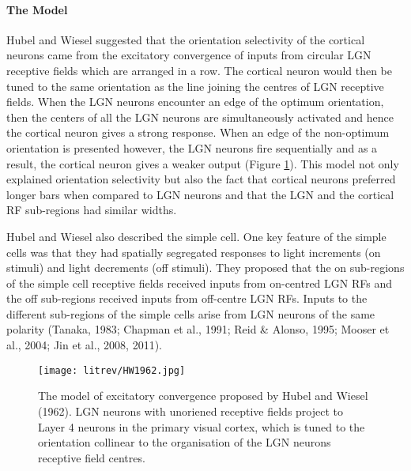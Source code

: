 \paragraph{The Model}Hubel and Wiesel suggested that the orientation selectivity of the cortical neurons came from the excitatory convergence of inputs from circular LGN receptive fields which are arranged in a row. The cortical neuron would then be tuned to the same orientation as the line joining the centres of LGN receptive fields. When the LGN neurons encounter an edge of the optimum orientation, then the centers of all the LGN neurons are simultaneously activated and hence the cortical neuron gives a strong response. When an edge of the non-optimum orientation is presented however, the LGN neurons fire sequentially and as a result, the cortical neuron gives a weaker output (Figure \ref{fig:HW}). This model not only explained orientation selectivity but also the fact that cortical neurons preferred longer bars when compared to LGN neurons and that the LGN and the cortical RF sub-regions had similar widths.

Hubel and Wiesel also described the simple cell. One key feature of the simple cells was that they had spatially segregated responses to light increments (on stimuli) and light decrements (off stimuli). They proposed that the on sub-regions of the simple cell receptive fields received inputs from on-centred LGN RFs and the off sub-regions received inputs from off-centre LGN RFs. Inputs to the different sub-regions of the simple cells arise from LGN neurons of the same polarity (Tanaka, 1983; Chapman et al., 1991; Reid \& Alonso, 1995; Mooser et al., 2004; Jin et al., 2008, 2011). 

	\begin{figure}[H]
	
	\texttt{[image: litrev/HW1962.jpg]}
	\caption{The model of excitatory convergence proposed by Hubel and Wiesel (1962). LGN neurons with unoriened receptive fields project to Layer 4 neurons in the primary visual cortex, which is tuned to the orientation collinear to the organisation of the LGN neurons receptive field centres.}
	\label{fig:HW}
	\end{figure}

